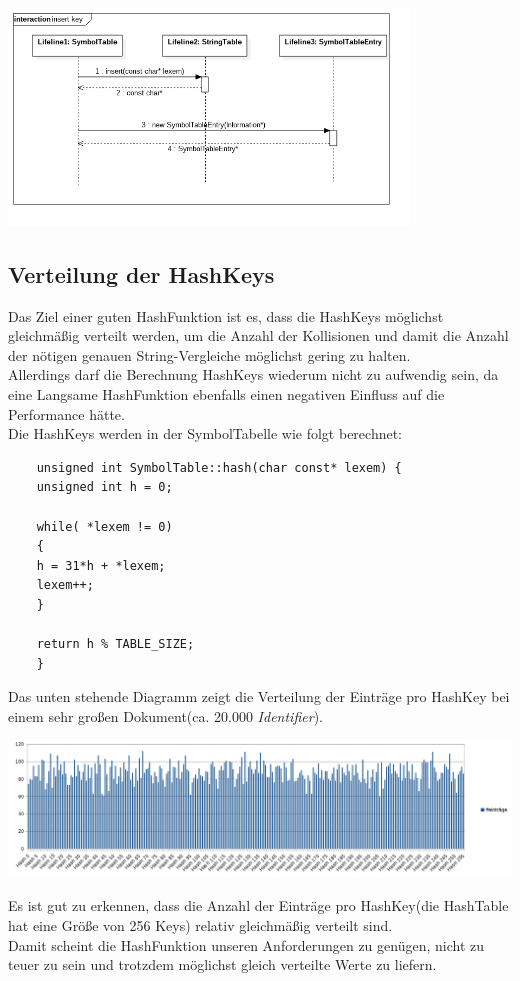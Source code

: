 \documentclass[
a4paper
]{scrreprt}
\begin{document}
	\begin{center}
		\includegraphics[width=0.8\textwidth]{./images/symtable_seq.png}
	\end{center}    
	
	\subsection*{Verteilung der HashKeys}
	Das Ziel einer guten HashFunktion ist es, dass die HashKeys möglichst gleichmäßig verteilt werden, um die Anzahl der Kollisionen und damit die Anzahl der nötigen genauen String-Vergleiche möglichst gering zu halten.\\
	
	Allerdings darf die Berechnung HashKeys wiederum nicht zu aufwendig sein, da eine Langsame HashFunktion ebenfalls einen negativen Einfluss auf die Performance hätte.\\
	Die HashKeys werden in der SymbolTabelle wie folgt berechnet:\\
	\pagebreak
	\begin{lstlisting}
	unsigned int SymbolTable::hash(char const* lexem) {
	unsigned int h = 0;
	
	while( *lexem != 0)
	{
	h = 31*h + *lexem;
	lexem++;
	}
	
	return h % TABLE_SIZE;
	}
	\end{lstlisting}
	
	
	Das unten stehende Diagramm zeigt die Verteilung der Einträge pro HashKey bei einem sehr großen Dokument(ca. 20.000 \emph{Identifier}). 
	\begin{center}
		\includegraphics[width=\textwidth]{./charts/hashtable_distribution.png}
	\end{center}
	Es ist gut zu erkennen, dass die Anzahl der Einträge pro HashKey(die HashTable hat eine Größe von 256 Keys) relativ gleichmäßig verteilt sind.\\
	Damit scheint die HashFunktion unseren Anforderungen zu genügen, nicht zu teuer zu sein und trotzdem möglichst gleich verteilte Werte zu liefern.
	
\end{document}
